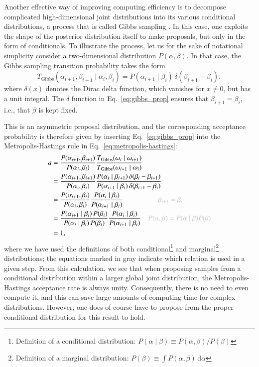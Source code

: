 \documentclass[onecolumn]{aa}
\begin{document}
Another effective way of improving computing efficiency is to decompose
complicated high-dimensional joint distributions into its various
conditional distributions, a process that is called Gibbs sampling
\citep{geman:1984}. In this case, one exploits the shape of the
posterior distribution itself to make proposals, but only in the form
of conditionals. To illustrate the process, let us for the sake of
notational simplicity consider a two-dimensional distribution
$P(\alpha, \beta)$. In that case, the Gibbs sampling transition
probability takes the form
\begin{equation}
  T_{\mathrm{Gibbs}}(\alpha_{i+1}, \beta_{i+1}\mid \alpha_i, \beta_i) =
  P(\alpha_{i+1}\mid \beta_{i})\,\delta(\beta_{i+1}-\beta_i),
  \label{eq:gibbs_prop}
\end{equation}
where $\delta(x)$ denotes the Dirac delta function, which vanishes for
$x\ne 0$, but has a unit integral. The $\delta$ function in
Eq.~\eqref{eq:gibbs_prop} ensures that $\beta_{i+1}=\beta_i$, i.e., that
$\beta$ is kept fixed.


This is an asymmetric proposal distribution, and the corresponding
acceptance probability is therefore given by inserting
Eq.~\eqref{eq:gibbs_prop} into the Metropolis-Hastings rule in
Eq.~\eqref{eq:metropolis-hastings}:
\begin{align}
  a &= \frac{P(\alpha_{i+1}, \beta_{i+1})}{P(\alpha_{i}, \beta_{i})}
  \frac{T_{\mathrm{Gibbs}}(\omega_{i}\mid
    \omega_{i+1})}{T_{\mathrm{Gibbs}}(\omega_{i+1}\mid \omega_i)}\\
  &= 
  \frac{P(\alpha_{i+1}, \beta_{i+1})}{P(\alpha_{i}, \beta_{i})}
  \frac{P(\alpha_{i}\mid
    \beta_{i+1})\,\delta(\beta_{i}-\beta_{i+1})}{P(\alpha_{i+1}\mid \beta_{i})\,\delta(\beta_{i+1}-\beta_i)}\\
  &= 
  \frac{P(\alpha_{i+1}, \beta_{i})}{P(\alpha_{i}, \beta_{i})}
  \frac{P(\alpha_{i}\mid \beta_{i})}{P(\alpha_{i+1}\mid \beta_{i})}\quad \quad\quad\quad\quad{\color{gray}\beta_{i+1}=\beta_i} \\
  &= 
  \frac{P(\alpha_{i+1}\mid \beta_i)\,P(\beta_{i})}{P(\alpha_{i}\mid \beta_{i})\,P(\beta_i)}
  \frac{P(\alpha_{i}\mid \beta_{i})}{P(\alpha_{i+1}\mid \beta_{i})}\quad {\color{gray} P(\alpha,\beta) = P(\alpha\mid\beta)P(\beta)}\\
  &= 1,
\end{align}
where we have used the definitions of both
conditional\footnote{Definition of a conditional distribution: $P(\alpha\mid \beta) \equiv P(\alpha,\beta)/P(\beta)$}
and marginal\footnote{Definition of a marginal distribution: $P(\beta) \equiv \int P(\alpha, \beta)\,\mathrm
  d\alpha$} distributions; the equations marked in gray indicate which
relation is used in a given step. From this calculation, we see that
when proposing samples from a conditional distribution within a larger
global joint distribution, the Metropolis-Hastings acceptance rate is
always unity. Consequently, there is no need to even compute it, and
this can save large amounts of computing time for complex
distributions. However, one does of course have to propose from the
proper conditional distribution for this result to hold.
\end{document}
